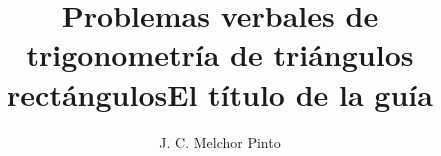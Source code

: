 \documentclass[12pt,addpoints,answers]{guia}
\title{Problemas verbales de trigonometría de triángulos rectángulos}
\title{El título de la guía}
\author{J. C. Melchor Pinto}
\begin{document}
\pagestyle{headandfoot}

\INFO
\printanswers
\vspace{-0.9cm}
\begin{multicols}{2}
    \columnbreak
\end{multicols}
%
% 
% 
\begin{questions}
    \questionboxed[10]{}
    \questionboxed[10]{}
    \questionboxed[10]{}
    \questionboxed[10]{}
    \questionboxed[10]{}
    \questionboxed[10]{}
    \questionboxed[10]{}
\end{questions}
\end{document}

